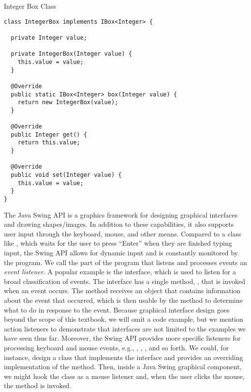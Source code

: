 \begin{cl}{Integer Box Class}
\begin{lstlisting}[language=MyJava]
class IntegerBox implements IBox<Integer> {
  
  private Integer value;
  
  private IntegerBox(Integer value) { 
    this.value = value; 
  }
  
  @Override
  public static IBox<Integer> box(Integer value) { 
    return new IntegerBox(value); 
  }
  
  @Override
  public Integer get() { 
    return this.value; 
  }
  
  @Override
  public void set(Integer value) { 
    this.value = value; 
  }
}
\end{lstlisting}
\end{cl}

The Java Swing API is a graphics framework for designing graphical interfaces and drawing shapes/images. In addition to these capabilities, it also supports user input through the keyboard, mouse, and other means. Compared to a class like , which waits for the user to press ``Enter'' when they are finished typing input, the Swing API allows for dynamic input and is constantly monitored by the program. We call the part of the program that listens and processes events an \textit{event listener}. A popular example is the  interface, which is used to listen for a broad classification of events. The  interface has a single method, , that is invoked when an event occurs. The  method receives an  object that contains information about the event that occurred, which is then usable by the method to determine what to do in response to the event. Because graphical interface design goes beyond the scope of this textbook, we will omit a code example, but we mention action listeners to demonstrate that interfaces are not limited to the examples we have seen thus far. Moreover, the Swing API provides more specific listeners for processing keyboard and mouse events, e.g., , , , and so forth. We could, for instance, design a class that implements the  interface and provides an overriding implementation of the  method. Then, inside a Java Swing graphical component, we might hook the class as a mouse listener and, when the user clicks the mouse, the  method is invoked.

